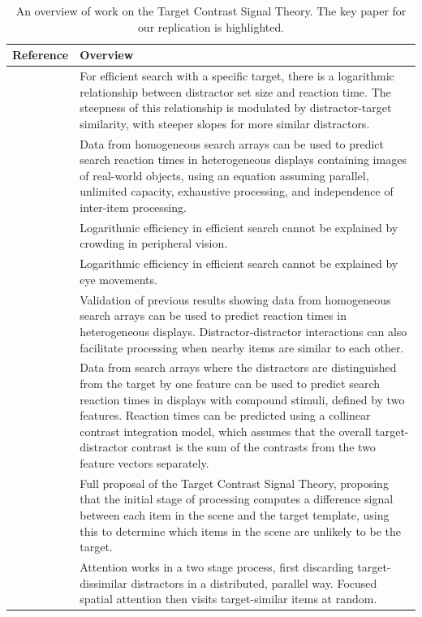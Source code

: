 \documentclass[preprint,12pt,authoryear]{elsarticle}
\begin{document}
\begin{table}[hp]
\centering
\begin{tabularx}{\textwidth}{lX}
Reference & Overview\\
 \hline 
\cite{buetti2016towards} & For efficient search with a specific target, there is a logarithmic relationship between distractor set size and reaction time. The steepness of this relationship is modulated by distractor-target similarity, with steeper slopes for more similar distractors.\\
\cite{wang2017predicting} & Data from homogeneous search arrays can be used to predict search reaction times in heterogeneous displays containing images of real-world objects, using an equation assuming parallel, unlimited capacity, exhaustive processing, and independence of inter-item processing. \\ 
\cite{madison2018role} & Logarithmic efficiency in efficient search cannot be explained by crowding in peripheral vision. \\
\cite{ng2018fixed} & Logarithmic efficiency in efficient search cannot be explained by eye movements. \\
\cite{lleras2019predicting} & Validation of previous results showing data from homogeneous search arrays can be used to predict reaction times in heterogeneous displays. Distractor-distractor interactions can also facilitate processing when nearby items are similar to each other. \\
\textbf{\cite{buetti2019predicting}} & Data from search arrays where the distractors are distinguished from the target by one feature can be used to predict search reaction times in displays with compound stimuli, defined by two features. Reaction times can be predicted using a collinear contrast integration model, which assumes that the overall target-distractor contrast is the sum of the contrasts from the two feature vectors separately. \\
\cite{lleras2020target} & Full proposal of the Target Contrast Signal Theory, proposing that the initial stage of processing computes a difference signal between each item in the scene and the target template, using this to determine which items in the scene are unlikely to be the target. \\
\cite{ng2020prioritization} & Attention works in a two stage process, first discarding target-dissimilar distractors in a distributed, parallel way. Focused spatial attention then visits target-similar items at random. \\
\end{tabularx}
\caption{An overview of work on the Target Contrast Signal Theory. The key paper for our replication is highlighted.}
\label{tab:tcs_overview}
\end{table}
\end{document}
